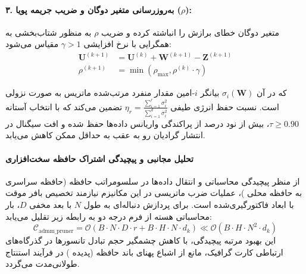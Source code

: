 \paragraph{۳. به‌روزرسانی متغیر دوگان و ضریب جریمه پویا ($\rho$):}
متغیر دوگان خطای برازش را انباشته کرده و ضریب $\rho$ به منظور شتاب‌بخشی به همگرایی با نرخ افزایشی $\gamma > 1$ مقیاس می‌شود:
\begin{align}
\mathbf{U}^{(k+1)} &= \mathbf{U}^{(k)} + \mathbf{W}^{(k+1)} - \mathbf{Z}^{(k+1)} \\
\rho^{(k+1)} &= \min\left(\rho_{\max}, \rho^{(k)} \cdot \gamma\right)
\end{align}

که در آن $\sigma_i(\mathbf{W})$ بیانگر $i$-امین مقدار منفرد مرتب‌شده ماتریس به صورت نزولی است. نسبت حفظ انرژی طیفی $\eta_r = \frac{\sum_{i=1}^r \sigma_i^2}{\sum_{i=1}^{d} \sigma_i^2}$ تضمین می‌کند که با انتخاب آستانه $\tau \ge 0.90$، بیش از نود درصد از پراکندگی واریانس داده‌ها حفظ شده و افت سیگنال در انتشار گرادیان رو به عقب به حداقل ممکن کاهش می‌یابد.

\paragraph{تحلیل مجانبی و پیچیدگی اشتراک حافظه سخت‌افزاری}
از منظر پیچیدگی محاسباتی و انتقال داده‌ها در سلسومراتب حافظه (حافظه سراسری  به حافظه محلی )، عملیات ضرب ماتریسی در این مکانیزم نیازمند تخصیص بافر موقت با ابعاد فاکتورگیری‌شده است. برای پردازش دنباله‌ای به طول $N$ با بعد مخفی $D$، بار محاسباتی هسته از فرم درجه دو به رابطه زیر تقلیل می‌یابد:
\begin{equation}
\label{eq:complexity_admm_pruner}
\mathcal{C}_{\text{admm\_pruner}} = \mathcal{O}\left( B \cdot N \cdot D \cdot r + B \cdot H \cdot N \cdot d_k \right) \ll \mathcal{O}\left( B \cdot H \cdot N^2 \cdot d_k \right)
\end{equation}
این بهبود مرتبه پیچیدگی، با کاهش چشمگیر حجم تبادل تانسورها در گذرگاه‌های ارتباطی کارت گرافیک، مانع از اشباع پهنای باند حافظه (پدیده ) در فرآیند استنتاج طولانی‌مدت می‌گردد.
